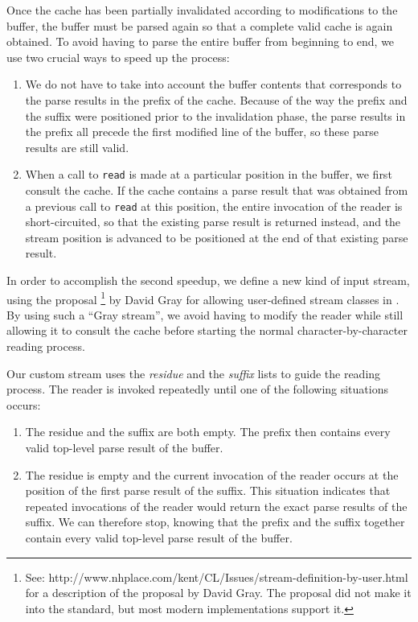 Once the cache has been partially invalidated according to
modifications to the buffer, the buffer must be parsed again so that a
complete valid cache is again obtained.  To avoid having to parse the
entire buffer from beginning to end, we use two crucial ways to speed
up the process:

\begin{enumerate}
\item We do not have to take into account the buffer contents that
  corresponds to the parse results in the prefix of the cache.
  Because of the way the prefix and the suffix were positioned prior
  to the invalidation phase, the parse results in the prefix all
  precede the first modified line of the buffer, so these parse
  results are still valid.
\item When a call to \texttt{read} is made at a particular position in
  the buffer, we first consult the cache.  If the cache contains a
  parse result that was obtained from a previous call to \texttt{read}
  at this position, the entire invocation of the reader is
  short-circuited, so that the existing parse result is returned
  instead, and the stream position is advanced to be positioned at the
  end of that existing parse result.
\end{enumerate}

In order to accomplish the second speedup, we define a new kind of
input stream, using the proposal%
\footnote{See:
  http://www.nhplace.com/kent/CL/Issues/stream-definition-by-user.html
  for a description of the proposal by David Gray.  The proposal did
  not make it into the \commonlisp{} standard, but most modern
  implementations support it.}
 by David Gray for allowing user-defined stream classes in
 \commonlisp{}.  By using such a ``Gray stream'', we avoid having to
 modify the reader while still allowing it to consult the cache before
 starting the normal character-by-character reading process.

Our custom stream uses the \emph{residue} and the \emph{suffix} lists
to guide the reading process.  The reader is invoked repeatedly until
one of the following situations occurs:

\begin{enumerate}
\item The residue and the suffix are both empty.  The prefix then
  contains every valid top-level parse result of the buffer.
\item The residue is empty and the current invocation of the reader
  occurs at the position of the first parse result of the suffix.
  This situation indicates that repeated invocations of the reader
  would return the exact parse results of the suffix.  We can
  therefore stop, knowing that the prefix and the suffix together
  contain every valid top-level parse result of the buffer.
\end{enumerate}

